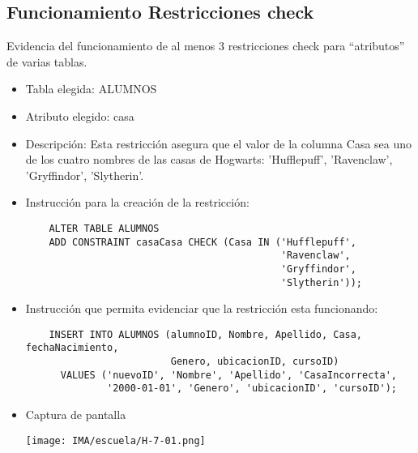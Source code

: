 \subsection{Funcionamiento Restricciones check}

Evidencia del funcionamiento de al menos 3 restricciones check para “atributos” de varias
tablas.

\begin{itemize} 
  \item Tabla elegida: ALUMNOS 
  \item Atributo elegido: casa 
  \item Descripción: Esta restricción asegura que el valor de la columna Casa sea uno de los cuatro nombres de las casas de Hogwarts: 'Hufflepuff', 'Ravenclaw', 'Gryffindor', 'Slytherin'. 
  \item Instrucción para la creación de la restricción: 
    \begin{verbatim} 
    ALTER TABLE ALUMNOS 
    ADD CONSTRAINT casaCasa CHECK (Casa IN ('Hufflepuff',
                                            'Ravenclaw', 
                                            'Gryffindor', 
                                            'Slytherin')); 
    \end{verbatim} 
  \item Instrucción que permita evidenciar que la restricción esta funcionando: 
    \begin{verbatim} 
    INSERT INTO ALUMNOS (alumnoID, Nombre, Apellido, Casa, fechaNacimiento,
                         Genero, ubicacionID, cursoID) 
      VALUES ('nuevoID', 'Nombre', 'Apellido', 'CasaIncorrecta', 
              '2000-01-01', 'Genero', 'ubicacionID', 'cursoID'); 
    \end{verbatim} 
  \item Captura de pantalla 
    \begin{center} 
      \texttt{[image: IMA/escuela/H-7-01.png]}
    \end{center} 
\end{itemize}

